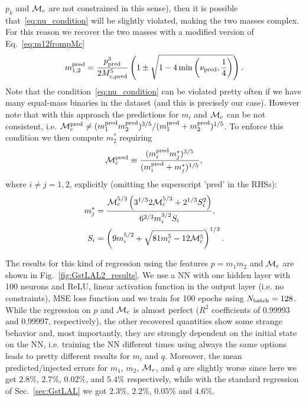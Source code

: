 \documentclass[prd,aps,twocolumn,a4paper,showkeys,nofootinbib]{revtex4-1}
\def\Mc{{\cal M}_c}
\begin{document}
$p_k$ and $\Mc$ are not constrained in this sense), 
then it is possible that~\eqref{eq:nu_condition} will be slightly violated, making
the two masses complex. For this reason we recover the two masses with a modified version
of Eq.~\eqref{eq:m12frompMc}
\begin{equation}
\label{eq:m12frompMc_mod}
m_{1,2}^{\rm pred} = \frac{p_{\rm pred}^3}{2 M_{c, \rm pred}^5}\left( 1 \pm \sqrt{1-4 \min\left(\nu_{\rm pred}, \frac{1}{4}\right)} \right).
\end{equation}
Note that the condition~\eqref{eq:nu_condition} can be violated pretty often 
if we have many equal-mass binaries in the dataset (and this is precisely our case).
However note that with this approach the predictions for $m_i$ and $\Mc$ can be not
consistent, i.e. 
$\Mc^{\rm pred} \neq (m_1^{\rm pred} m_2^{\rm pred})^{3/5}/(m_1^{\rm pred} + m_2^{\rm pred})^{1/5}$.
To enforce this condition we then compute $m_2^*$ requiring 
\begin{equation}
\Mc^{\rm pred} \equiv \frac{(m_i^{\rm pred} m_j^*)^{3/5}}{(m_i^{\rm pred} + m_j^{*})^{1/5}},
\end{equation}
where $i\neq j=1,2$, explicitly (omitting the superscript 'pred' in the RHSs):
\begin{align}
m_j^* &= \frac{\Mc^{5/3}\left(3^{1/3} 2 \Mc^{5/3}+2^{1/3} S_i^2 \right) }{ 6^{2/3} m_i^{3/2} S_i },  \\
S_i   &= \left(9 m_i^{5/2} + \sqrt{81 m_i^5 -12 \Mc^5}\right)^{1/3}.
\end{align}

The results for this kind of regression using the features $p=m_1 m_2$ and $\Mc$
are shown in Fig.~\ref{fig:GstLAL2_results}. We use a NN with one hidden layer with 
100 neurons and ReLU, linear activation function in the output layer (i.e. no constraints),
MSE loss function and we train for 100 epochs using $N_{\rm batch}=128$. 
While the regression on $p$ and $\Mc$ is almost perfect ($R^2$ coefficients of 0.99993 and 
0.99997, respectively), the other recovered quantities show some strange behavior and, most
importantly, they are strongly dependent on the initial state on the NN, i.e. training the NN
different times using always the same options leads to pretty different results for $m_i$ and $q$.
Moreover, the mean predicted/injected errors for $m_1$, $m_2$, $\Mc$, and $q$ are slightly worse 
since here we get $2.8\%$, $2.7\%$, $0.02\%$, and $5.4\%$ respectively, while with the standard 
regression of Sec.~\ref{sec:GstLAL} we got $2.3\%$, $2.2\%$, $0.05\%$ and $4.6\%$.
\end{document}
